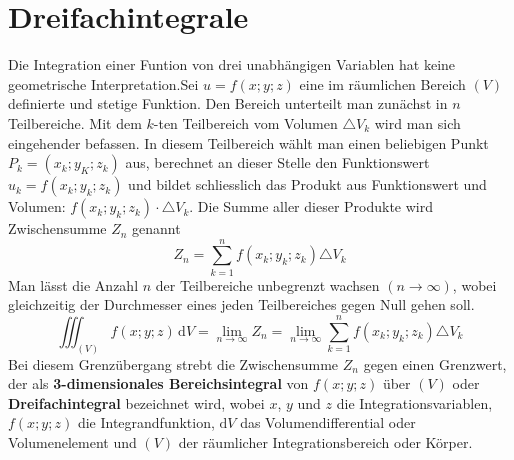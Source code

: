 \section{Dreifachintegrale}
Die Integration einer Funtion von drei unabhängigen Variablen hat keine geometrische Interpretation.Sei $u=f\left(x; y; z\right)$ eine im räumlichen Bereich $\left(V\right)$ definierte und stetige Funktion. Den Bereich unterteilt man zunächst in $n$ Teilbereiche. Mit dem $k$-ten Teilbereich vom Volumen $\triangle V_k$ wird man sich eingehender befassen. In diesem Teilbereich wählt man einen beliebigen Punkt $P_k=\left(x_k; y_K; z_k\right)$ aus, berechnet an dieser Stelle den Funktionswert $u_k=f\left(x_k; y_k; z_k\right)$ und bildet schliesslich das Produkt aus Funktionswert und Volumen: $f\left(x_k; y_k; z_k\right)\cdot \triangle V_k$.
\newline\newline
Die Summe aller dieser Produkte wird Zwischensumme $Z_n$ genannt
\begin{equation}
\boxed{Z_n=\displaystyle \sum_{k=1}^n f\left(x_k; y_k; z_k\right)\triangle V_k}
\end{equation}
Man lässt die Anzahl $n$ der Teilbereiche unbegrenzt wachsen $\left(n\rightarrow \infty\right)$, wobei gleichzeitig der Durchmesser eines jeden Teilbereiches gegen Null gehen soll. 
\begin{equation}
\boxed{\displaystyle \iiint_{\left(V\right)}f\left(x; y; z\right)\,\text{d}V=\displaystyle \lim_{n\rightarrow \infty}Z_n=\displaystyle \lim_{n\rightarrow \infty}\displaystyle \sum_{k=1}^n f\left(x_k; y_k; z_k\right)\triangle V_k}
\end{equation}
Bei diesem Grenzübergang strebt die Zwischensumme $Z_n$ gegen einen Grenzwert, der als \textbf{3-dimensionales Bereichsintegral} von $f\left(x; y; z\right)$ über $\left(V\right)$ oder \textbf{Dreifachintegral} bezeichnet wird, wobei $x$, $y$ und $z$ die Integrationsvariablen, $f\left(x; y; z\right)$ die Integrandfunktion, $\text{d}V$ das Volumendifferential oder Volumenelement und $\left(V\right)$ der räumlicher Integrationsbereich oder Körper.
